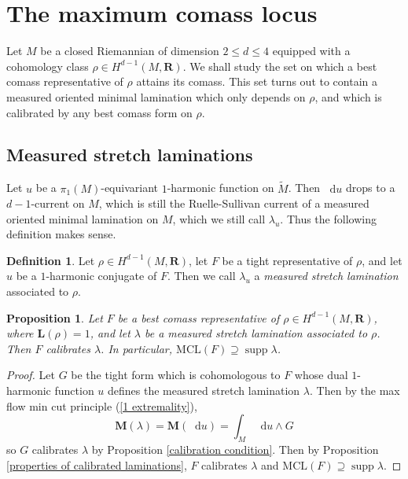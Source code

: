 \documentclass[reqno,11pt]{amsart}
\newcommand{\RR}{\mathbf{R}}
\newcommand*\dif{\mathop{}\!\mathrm{d}}
\DeclareMathOperator{\supp}{supp}
\newcommand{\MCL}{\mathrm{MCL}}
\newcommand{\Mass}{\mathbf M}
\newcommand{\Comass}{\mathbf L}
\newcommand{\dfn}[1]{\emph{#1}\index{#1}}
\newtheorem{proposition}[theorem]{Proposition}
\theoremstyle{definition}
\newtheorem{definition}[theorem]{Definition}
\numberwithin{equation}{section}
\begin{document}


\section{The maximum comass locus}\label{MCL sec}
Let $M$ be a closed Riemannian of dimension $2 \leq d \leq 4$ equipped with a cohomology class $\rho \in H^{d - 1}(M, \RR)$.
We shall study the set on which a best comass representative of $\rho$ attains its comass.
This set turns out to contain a measured oriented minimal lamination which only depends on $\rho$, and which is calibrated by any best comass form on $\rho$.

\subsection{Measured stretch laminations}
Let $u$ be a $\pi_1(M)$-equivariant $1$-harmonic function on $\tilde M$.
Then $\dif u$ drops to a $d-1$-current on $M$, which is still the Ruelle-Sullivan current of a measured oriented minimal lamination on $M$, which we still call $\lambda_u$.
Thus the following definition makes sense.

\begin{definition}
Let $\rho \in H^{d - 1}(M, \RR)$, let $F$ be a tight representative of $\rho$, and let $u$ be a $1$-harmonic conjugate of $F$.
Then we call $\lambda_u$ a \dfn{measured stretch lamination} associated to $\rho$.
\end{definition}

\begin{proposition}\label{MCL contains Thurston}
Let $F$ be a best comass representative of $\rho \in H^{d - 1}(M, \RR)$, where $\Comass(\rho) = 1$, and let $\lambda$ be a measured stretch lamination associated to $\rho$.
Then $F$ calibrates $\lambda$. In particular, $\MCL(F) \supseteq \supp \lambda$.
\end{proposition}
\begin{proof}
Let $G$ be the tight form which is cohomologous to $F$ whose dual $1$-harmonic function $u$ defines the measured stretch lamination $\lambda$.
Then by the max flow min cut principle (\ref{1 extremality}), 
$$\Mass(\lambda) = \Mass(\dif u) = \int_M \dif u \wedge G$$
so $G$ calibrates $\lambda$ by Proposition \ref{calibration condition}.
Then by Proposition \ref{properties of calibrated laminations}, $F$ calibrates $\lambda$ and $\MCL(F) \supseteq \supp \lambda$.
\end{proof}
\end{document}
